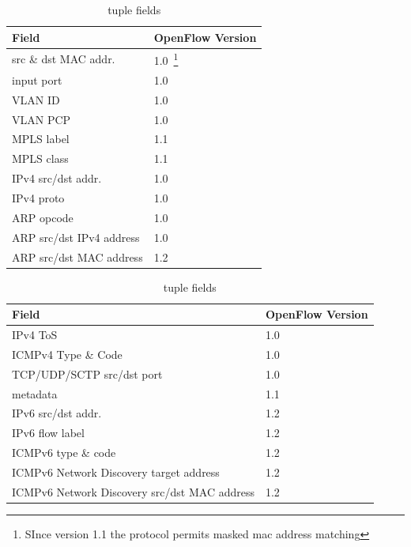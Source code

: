 \begin{table}
  \begin{minipage} []{0.49\textwidth} 
    \begin{tabular}{|p{4cm}  | p{2cm} |} 
      \hline
      Field & OpenFlow Version \\ 
      \hline
      src \& dst MAC addr. & 1.0~\footnote{SInce version 1.1 the protocol
        permits masked mac address matching} \\ \hline
      input port & 1.0 \\ \hline
      VLAN ID & 1.0 \\ \hline 
      VLAN PCP & 1.0 \\ \hline
      MPLS label & 1.1 \\ \hline
      MPLS class & 1.1 \\ \hline 
      IPv4 src/dst addr. & 1.0 \\ \hline
      IPv4 proto & 1.0 \\ \hline
      ARP opcode & 1.0 \\ \hline 
      ARP src/dst IPv4 address & 1.0 \\ \hline 
      ARP src/dst MAC address & 1.2 \\ \hline 
    \end{tabular}
  \end{minipage}
  \begin{minipage} []{0.49\textwidth} 
    \begin{tabular}{|p{4cm}  | p{2cm} |} 
      \hline
      Field & OpenFlow Version \\  \hline
      IPv4 ToS & 1.0 \\ \hline 
      ICMPv4 Type \& Code & 1.0 \\ \hline
      TCP/UDP/SCTP src/dst port & 1.0 \\ \hline
      metadata & 1.1 \\ \hline
      IPv6 src/dst addr. & 1.2 \\ \hline
      IPv6 flow label & 1.2 \\ \hline
      ICMPv6 type \& code & 1.2 \\ \hline
      ICMPv6 Network Discovery target address & 1.2 \\ \hline
      ICMPv6 Network Discovery src/dst MAC address & 1.2 \\ \hline
    \end{tabular}
  \end{minipage}
    \caption{\of tuple fields} \label{tbl:background:openflow_tupple}
\end{table}
